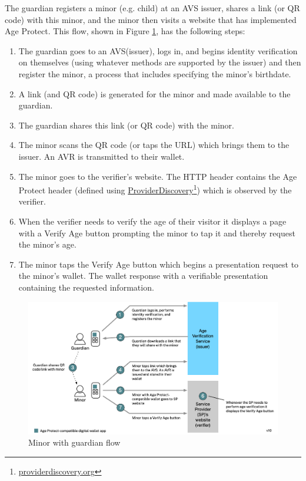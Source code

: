 \documentclass[11pt, oneside]{article}   	%
\newcommand{\hyperfootnote}[1][]{\def\ArgI{{#1}}\hyperfootnoteRelay}
\newcommand\hyperfootnoteRelay[2][]{\href{#1#2}{\ArgI}\footnote{\href{#1#2}{#2}}}
\begin{document}
The guardian registers a minor (e.g. child) at an AVS issuer, shares a link (or QR code) with this minor, and the minor then visits a website that has implemented Age Protect. This flow, shown in Figure \ref{fig:guardian+minor}, has the following steps:
\begin{enumerate}
	\item The guardian goes to an AVS(issuer), logs in, and begins identity verification on themselves (using whatever methods are supported by the issuer) and then register the minor, a process that includes specifying the minor's birthdate.
	\item A link (and QR code) is generated for the minor and made available to the guardian.
	\item The guardian shares this link (or QR code) with the minor.
	\item The minor scans the QR code (or taps the URL) which brings them to the issuer. An AVR is transmitted to their wallet.
	\item The minor goes to the verifier's website. The HTTP header contains the Age Protect header (defined using \hyperfootnote[ProviderDiscovery][https://]{providerdiscovery.org}) which is observed by the verifier.
	\item When the verifier needs to verify the age of their visitor it displays a page with a Verify Age button prompting the minor to tap it and thereby request the minor's age.
	\item The minor taps the Verify Age button which begins a presentation request to the minor's wallet. The wallet response with a verifiable presentation containing the requested information.
\end{enumerate}

\begin{figure}
	\includegraphics[width=\textwidth]{./images/guardian+minor.png}
	\caption{Minor with guardian flow}
	\label{fig:guardian+minor}
\end{figure}
\end{document}
